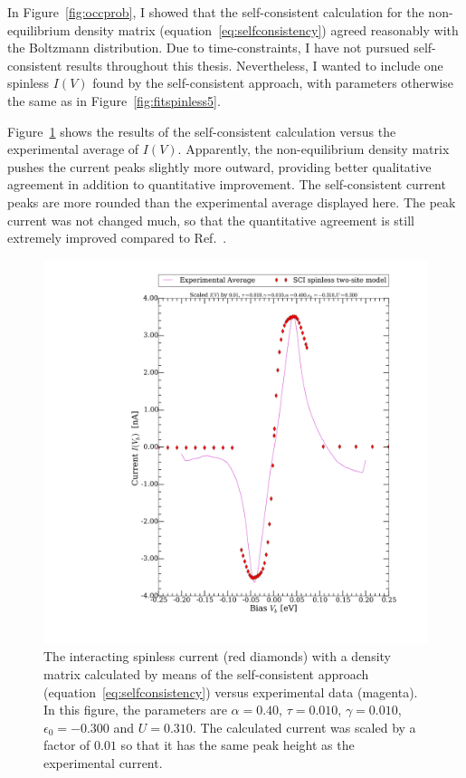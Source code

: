 In Figure~\ref{fig:occprob}, I showed that the self-consistent calculation for the non-equilibrium density matrix (equation~\ref{eq:selfconsistency}) agreed reasonably with the Boltzmann distribution. Due to time-constraints, I have not pursued self-consistent results throughout this thesis. Nevertheless, I wanted to include one spinless $I(V)$ found by the self-consistent approach, with parameters otherwise the same as in Figure~\ref{fig:fitspinless5}.

Figure~\ref{fig:figselfconsistent} shows the results of the self-consistent calculation versus the experimental average of $I(V)$. Apparently, the non-equilibrium density matrix pushes the current peaks slightly more outward, providing better qualitative agreement in addition to quantitative improvement.
The self-consistent current peaks are more rounded than the experimental average displayed here. The peak current was not changed much, so that the quantitative agreement is still extremely improved compared to Ref.~\cite{perrinnano}.


\begin{figure}[htb]
    \centering
    \includegraphics[width=.95\textwidth, clip=true, trim=11cm 2cm 2cm 0cm]{pdf/selfconsistentwow.pdf}
    \caption{The interacting spinless current (red diamonds) with a density matrix calculated by means of the self-consistent approach (equation~\ref{eq:selfconsistency}) versus experimental data (magenta). In this figure, the parameters are $\alpha=0.40$, $\tau=0.010$, $\gamma=0.010$, $\epsilon_0=-0.300$ and $U=0.310$. The calculated current was scaled by a factor of $0.01$ so that it has the same peak height as the experimental current.  }  
    \label{fig:figselfconsistent}
\end{figure} 
\clearpage
{}
